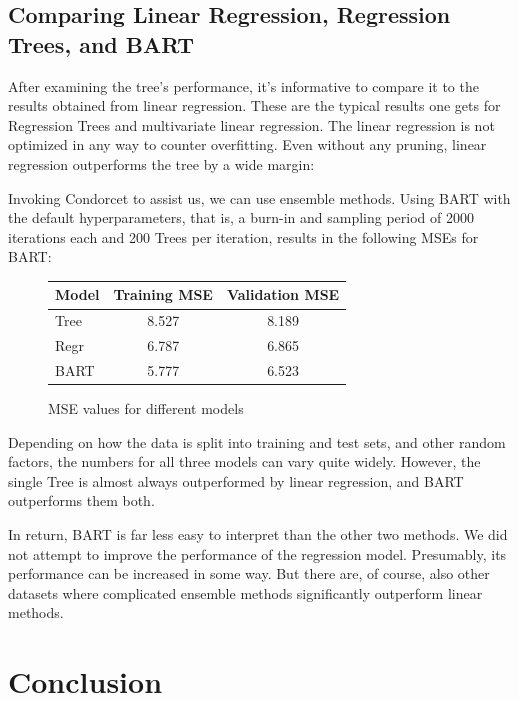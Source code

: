 \documentclass[12pt]{article}
\begin{document}
\subsection{Comparing Linear Regression, Regression Trees, and BART}

After examining the tree's performance, it's informative to compare it to the results obtained from linear regression. These are the typical results one gets for Regression Trees and multivariate linear regression. The linear regression is not optimized in any way to counter overfitting. Even without any pruning, linear regression outperforms the tree by a wide margin:

Invoking Condorcet to assist us, we can use ensemble methods. Using BART with the default hyperparameters, that is, a burn-in and sampling period of 2000 iterations each and 200 Trees per iteration, results in the following MSEs for BART:

\begin{figure}
    \centering
    \begin{tabular}{| l | c | c |}
        \hline
        Model & Training MSE & Validation MSE \\
        \hline
        Tree  & 8.527        & 8.189          \\
        Regr  & 6.787        & 6.865          \\
        BART  & 5.777        & 6.523          \\
        \hline
    \end{tabular}
    \caption{MSE values for different models}
\end{figure}

Depending on how the data is split into training and test sets, and other random factors, the numbers for all three models can vary quite widely. However, the single Tree is almost always outperformed by linear regression, and BART outperforms them both.

In return, BART is far less easy to interpret than the other two methods. We did not attempt to improve the performance of the regression model. Presumably, its performance can be increased in some way. But there are, of course, also other datasets where complicated ensemble methods significantly outperform linear methods.


\section{Conclusion}
\end{document}
